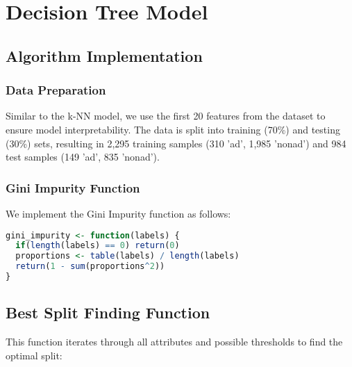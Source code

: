 \section{Decision Tree Model}

\subsection{Algorithm Implementation}

\subsubsection{Data Preparation}

Similar to the k-NN model, we use the first 20 features from the dataset to ensure model interpretability. The data is split into training (70\%) and testing (30\%) sets, resulting in 2,295 training samples (310 'ad', 1,985 'nonad') and 984 test samples (149 'ad', 835 'nonad').

\subsubsection{Gini Impurity Function}

We implement the Gini Impurity function as follows:

\begin{lstlisting}[language=R, caption=Gini Impurity Function]
gini_impurity <- function(labels) {
  if(length(labels) == 0) return(0)
  proportions <- table(labels) / length(labels)
  return(1 - sum(proportions^2))
}
\end{lstlisting}

\subsection{Best Split Finding Function}

This function iterates through all attributes and possible thresholds to find the optimal split:

